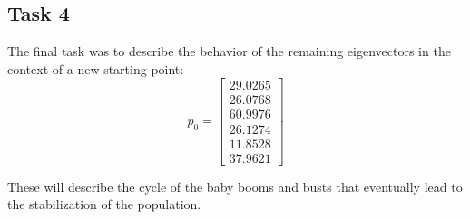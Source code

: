 \documentclass[12pt]{extarticle}
\begin{document}
\subsection{Task 4}
The final task was to describe the behavior of the remaining eigenvectors in the context of a new starting point:
\[p_0 = \begin{bmatrix}
29.0265\\26.0768\\60.9976\\26.1274\\11.8528\\37.9621
\end{bmatrix}\]

These will describe the cycle of the baby booms and busts that eventually lead to the stabilization of the population. 
\end{document}
